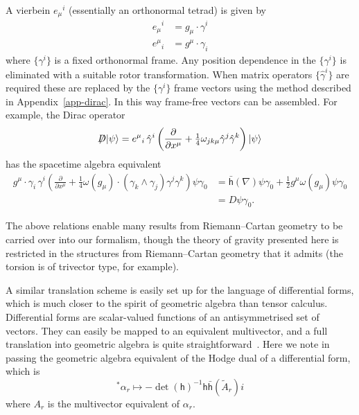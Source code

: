 \documentclass[a4paper]{article}
\numberwithin{equation}{section}
\newcommand{\nn}{\nonumber}
\newcommand{\dt}{\! \cdot \!}
\newcommand{\wdg}{\! \wedge \!}
\newcommand{\ra}{\rangle}
\newcommand{\half}{{\textstyle \frac{1}{2}}}
\newcommand{\qrt}{{\textstyle \frac{1}{4}}}
\newcommand{\eqv}{=}
\newcommand{\alp}{\alpha}
\newcommand{\gam}{\gamma}
\newcommand{\om}{\omega}
\newcommand{\go}{\gamma_{0}}
\newcommand{\hgam}{\hat{\gamma}}
\newcommand{\lih}{\mathsf{h}}
\newcommand{\lbh}{\bar{\mathsf{h}}}
\newcommand{\ho}{\lbh}
\newcommand{\hu}{\lih}
\newcommand{\grad}{\nabla}
\newcommand{\deriv}[2]{\frac{\partial #1}{\partial #2}}
\newcommand{\dhi}{\det(\hu)^{-1}}
\begin{document}
A vierbein ${e_\mu}^i$ (essentially an orthonormal tetrad) is given by
%
\begin{align}
{e_\mu}^i &= g_\mu \dt \gam^i \\
{e^\mu}_i &= g^\mu \dt \gam_i
\end{align}
%
where $\{\gam^i\}$ is a fixed orthonormal frame.  Any position
dependence in the $\{\gam^i\}$ is eliminated with a suitable rotor
transformation.  When matrix operators $\{\hgam^i\}$ are required
these are replaced by the $\{\gam^i\}$ frame vectors using the method
described in Appendix~\ref{app-dirac}.  In this way frame-free
vectors can be assembled.  For example, the Dirac
operator~\cite[Chapter 11]{goc-diff}
%
\begin{equation}
\not\!\!D |\psi \ra \eqv {e^\mu}_i\, \hgam^i \left(\deriv{}{x^\mu} +
\qrt \om_{jk\mu} \hgam^j\hgam^k \right) |\psi \ra
\end{equation} 
%
has the spacetime algebra equivalent
%
\begin{align}
g^\mu \dt \gam_i \, \gam^i \left( \deriv{}{x^\mu} + \qrt
\om(g_\mu)\dt(\gam_k \wdg \gam_j)  \gam^j \gam^k  \right) \psi \go 
&= \ho(\grad) \psi \go + \half g^\mu \om(g_\mu)  \psi \go \nn \\
&= D \psi \go.
\end{align}
%

The above relations enable many results from Riemann--Cartan geometry
to be carried over into our formalism, though the theory of gravity
presented here is restricted in the structures from Riemann--Cartan
geometry that it admits (the torsion is of trivector type, for
example).


A similar translation scheme is easily set up for the language of
differential forms, which is much closer to the spirit of geometric
algebra than tensor calculus.  Differential forms are scalar-valued
functions of an antisymmetrised set of vectors.  They can easily be
mapped to an equivalent multivector, and a full translation into
geometric algebra is quite straightforward~\cite{hes-gc}.  Here we
note in passing the geometric algebra equivalent of the Hodge dual of
a differential form, which is
%
\begin{equation}
{ }^* \alp_r \mapsto - \dhi \hu \ho(\tilde{A}_r) i
\end{equation}
%
where $A_r$ is the multivector equivalent of $\alp_r$.
\end{document}
